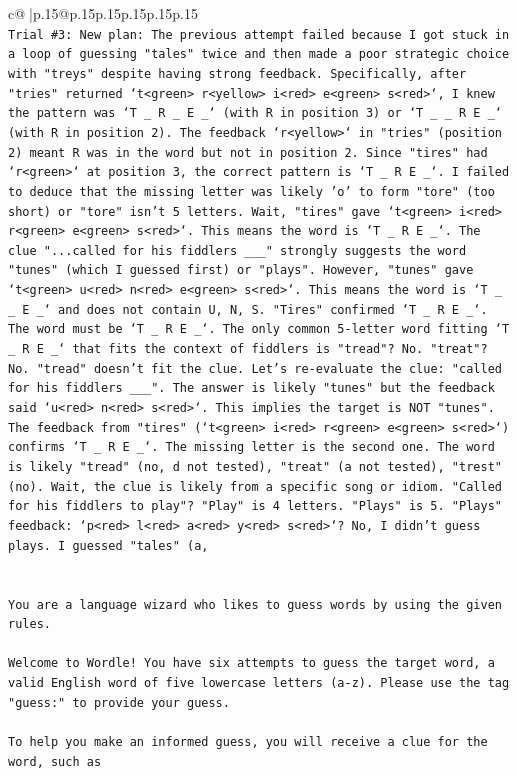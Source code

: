 \documentclass{article}
\begin{document}
{\begin{supertabular}{c@{$\;$}|p{.15\linewidth}@{}p{.15\linewidth}p{.15\linewidth}p{.15\linewidth}p{.15\linewidth}p{.15\linewidth}}
{{{\\ 
\texttt{Trial \#3: New plan: The previous attempt failed because I got stuck in a loop of guessing "tales" twice and then made a poor strategic choice with "treys" despite having strong feedback. Specifically, after "tries" returned `t<green> r<yellow> i<red> e<green> s<red>`, I knew the pattern was `T \_ R \_ E \_` (with R in position 3) or `T \_ \_ R E \_` (with R in position 2). The feedback `r<yellow>` in "tries" (position 2) meant R was in the word but not in position 2. Since "tires" had `r<green>` at position 3, the correct pattern is `T \_ R E \_`. I failed to deduce that the missing letter was likely 'o' to form "tore" (too short) or "tore" isn't 5 letters. Wait, "tires" gave `t<green> i<red> r<green> e<green> s<red>`. This means the word is `T \_ R E \_`. The clue "...called for his fiddlers \_\_\_" strongly suggests the word "tunes" (which I guessed first) or "plays". However, "tunes" gave `t<green> u<red> n<red> e<green> s<red>`. This means the word is `T \_ \_ E \_` and does not contain U, N, S. "Tires" confirmed `T \_ R E \_`. The word must be `T \_ R E \_`. The only common 5{-}letter word fitting `T \_ R E \_` that fits the context of fiddlers is "tread"? No. "treat"? No. "tread" doesn't fit the clue. Let's re{-}evaluate the clue: "called for his fiddlers \_\_\_". The answer is likely "tunes" but the feedback said `u<red> n<red> s<red>`. This implies the target is NOT "tunes". The feedback from "tires" (`t<green> i<red> r<green> e<green> s<red>`) confirms `T \_ R E \_`. The missing letter is the second one. The word is likely "tread" (no, d not tested), "treat" (a not tested), "trest" (no). Wait, the clue is likely from a specific song or idiom. "Called for his fiddlers to play"? "Play" is 4 letters. "Plays" is 5. "Plays" feedback: `p<red> l<red> a<red> y<red> s<red>`? No, I didn't guess plays. I guessed "tales" (a,} \\
\\ 
\\ 
\texttt{You are a language wizard who likes to guess words by using the given rules.} \\
\\ 
\texttt{Welcome to Wordle! You have six attempts to guess the target word, a valid English word of five lowercase letters (a{-}z). Please use the tag "guess:" to provide your guess.} \\
\\ 
\texttt{To help you make an informed guess, you will receive a clue for the word, such as} \\
}}}
\end{supertabular}}
\end{document}
